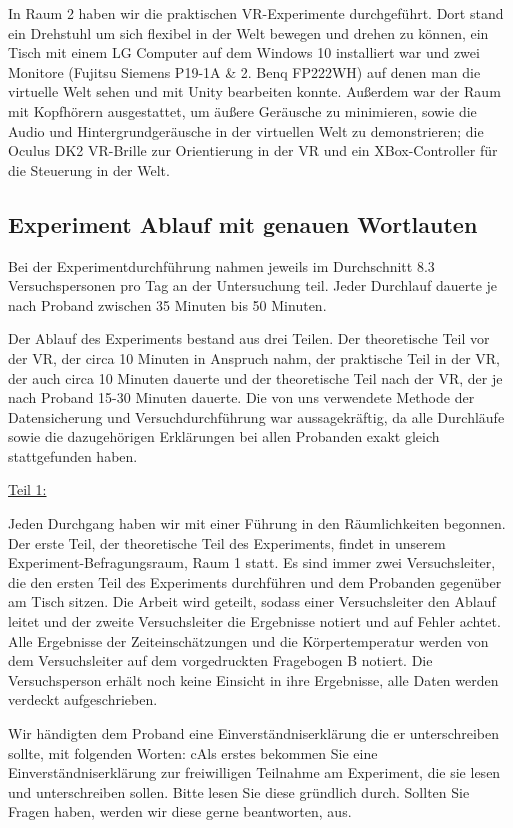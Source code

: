 \documentclass{Bericht}
\begin{document}
In Raum 2 haben wir die praktischen VR-Experimente durchgeführt. Dort stand ein Drehstuhl um sich flexibel in der Welt bewegen und drehen zu können, ein Tisch mit einem LG Computer auf dem  Windows 10 installiert war und zwei Monitore (Fujitsu Siemens P19-1A \& 2. Benq FP222WH) auf denen man die virtuelle Welt sehen und mit Unity bearbeiten konnte. Außerdem war der Raum mit Kopfhörern ausgestattet, um äußere Geräusche zu minimieren, sowie die Audio und Hintergrundgeräusche in der virtuellen Welt zu demonstrieren; die Oculus DK2 VR-Brille zur Orientierung in der VR und ein XBox-Controller für die Steuerung in der Welt.

\subsection {Experiment Ablauf mit genauen Wortlauten}

Bei der Experimentdurchführung nahmen jeweils im Durchschnitt 8.3 Versuchspersonen pro Tag an der Untersuchung teil. Jeder Durchlauf dauerte je nach Proband zwischen 35 Minuten bis 50 Minuten.

Der Ablauf des Experiments bestand aus drei Teilen. Der theoretische Teil vor der VR, der circa 10 Minuten in Anspruch nahm, der praktische Teil in der VR, der auch circa 10 Minuten dauerte und der theoretische Teil nach der VR, der je nach Proband 15-30 Minuten dauerte. Die von uns verwendete Methode der Datensicherung und Versuchdurchführung war aussagekräftig, da alle Durchläufe sowie die dazugehörigen Erklärungen bei allen Probanden exakt gleich stattgefunden haben.

\underline{Teil 1:}

Jeden Durchgang haben wir mit einer Führung in den Räumlichkeiten begonnen. Der erste Teil, der theoretische Teil des Experiments, findet in unserem Experiment-Befragungsraum, \glqq Raum 1\grqq{} statt. Es sind immer zwei Versuchsleiter, die den ersten Teil des Experiments durchführen und dem Probanden gegenüber am Tisch sitzen. Die Arbeit wird geteilt, sodass einer Versuchsleiter den Ablauf leitet und der zweite Versuchsleiter die Ergebnisse notiert und auf Fehler achtet. Alle Ergebnisse der Zeiteinschätzungen und die Körpertemperatur werden von dem Versuchsleiter auf dem vorgedruckten \glqq Fragebogen B\grqq{} notiert. Die Versuchsperson erhält noch keine Einsicht in ihre Ergebnisse, alle Daten werden verdeckt aufgeschrieben.

Wir händigten dem Proband eine Einverständniserklärung die er unterschreiben sollte, mit folgenden Worten:
c\glqq Als erstes bekommen Sie eine Einverständniserklärung zur freiwilligen Teilnahme am Experiment, die sie lesen und unterschreiben sollen. Bitte lesen Sie diese gründlich durch. Sollten Sie Fragen haben, werden wir diese gerne beantworten\grqq{}, aus.
\end{document}
